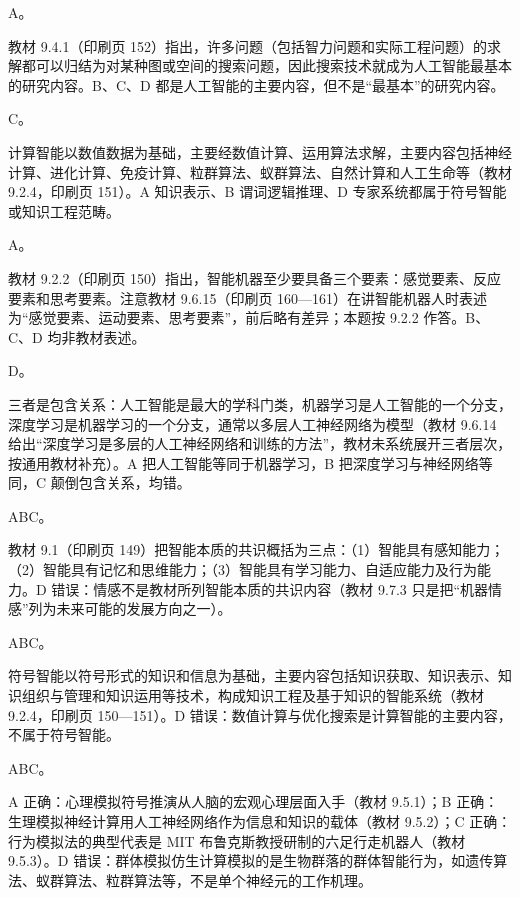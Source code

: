 \documentclass[a4paper,11pt]{article}
\begin{document}
\q A。\begin{analysis}教材 9.4.1（印刷页 152）指出，许多问题（包括智力问题和实际工程问题）的求解都可以归结为对某种图或空间的搜索问题，因此搜索技术就成为人工智能最基本的研究内容。B、C、D 都是人工智能的主要内容，但不是“最基本”的研究内容。\end{analysis}

\q C。\begin{analysis}计算智能以数值数据为基础，主要经数值计算、运用算法求解，主要内容包括神经计算、进化计算、免疫计算、粒群算法、蚁群算法、自然计算和人工生命等（教材 9.2.4，印刷页 151）。A 知识表示、B 谓词逻辑推理、D 专家系统都属于符号智能或知识工程范畴。\end{analysis}

\q A。\begin{analysis}教材 9.2.2（印刷页 150）指出，智能机器至少要具备三个要素：感觉要素、反应要素和思考要素。注意教材 9.6.15（印刷页 160—161）在讲智能机器人时表述为“感觉要素、运动要素、思考要素”，前后略有差异；本题按 9.2.2 作答。B、C、D 均非教材表述。\end{analysis}

\q D。\begin{analysis}三者是包含关系：人工智能是最大的学科门类，机器学习是人工智能的一个分支，深度学习是机器学习的一个分支，通常以多层人工神经网络为模型（教材 9.6.14 给出“深度学习是多层的人工神经网络和训练的方法”，教材未系统展开三者层次，按通用教材补充）。A 把人工智能等同于机器学习，B 把深度学习与神经网络等同，C 颠倒包含关系，均错。\end{analysis}


\q ABC。\begin{analysis}教材 9.1（印刷页 149）把智能本质的共识概括为三点：（1）智能具有感知能力；（2）智能具有记忆和思维能力；（3）智能具有学习能力、自适应能力及行为能力。D 错误：情感不是教材所列智能本质的共识内容（教材 9.7.3 只是把“机器情感”列为未来可能的发展方向之一）。\end{analysis}

\q ABC。\begin{analysis}符号智能以符号形式的知识和信息为基础，主要内容包括知识获取、知识表示、知识组织与管理和知识运用等技术，构成知识工程及基于知识的智能系统（教材 9.2.4，印刷页 150—151）。D 错误：数值计算与优化搜索是计算智能的主要内容，不属于符号智能。\end{analysis}

\q ABC。\begin{analysis}A 正确：心理模拟符号推演从人脑的宏观心理层面入手（教材 9.5.1）；B 正确：生理模拟神经计算用人工神经网络作为信息和知识的载体（教材 9.5.2）；C 正确：行为模拟法的典型代表是 MIT 布鲁克斯教授研制的六足行走机器人（教材 9.5.3）。D 错误：群体模拟仿生计算模拟的是生物群落的群体智能行为，如遗传算法、蚁群算法、粒群算法等，不是单个神经元的工作机理。\end{analysis}
\end{document}
